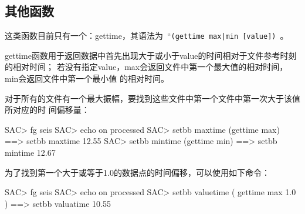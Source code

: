 \subsection{其他函数}
这类函数目前只有一个：gettime，其语法为~``\verb+(gettime max|min [value])+~。

gettime函数用于返回数据中首先出现大于或小于value的时间相对于文件参考时刻的相对时间；
若没有指定value，max会返回文件中第一个最大值的相对时间，min会返回文件中第一个最小值
的相对时间。

对于所有的文件有一个最大振幅，要找到这些文件中第一个文件中第一次大于该值所对应的时
间偏移量：
\begin{SACCode}
SAC> fg seis
SAC> echo on processed
SAC> setbb maxtime (gettime max)
 ==>  setbb maxtime 12.55
SAC> setbb mintime (gettime min)
 ==>  setbb mintime 12.67
\end{SACCode}

为了找到第一个大于或等于1.0的数据点的时间偏移，可以使用如下命令：
\begin{SACCode}
SAC> fg seis
SAC> echo on processed
SAC> setbb valuetime ( gettime max 1.0 )
 ==> setbb valuatime 10.55
\end{SACCode}
